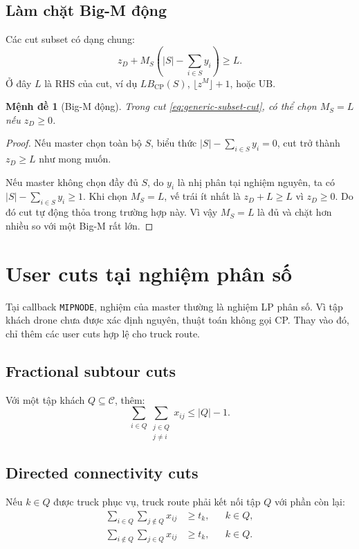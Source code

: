 \documentclass[12pt,a4paper]{article}
\newtheorem{proposition}{Mệnh đề}
\newcommand{\C}{\mathcal{C}}
\newcommand{\UB}{\mathrm{UB}}
\begin{document}
\subsection{Làm chặt Big-M động}

Các cut subset có dạng chung:
\begin{equation}
    z_D+M_S\left(|S|-\sum_{i\in S}y_i\right)\ge L.
    \label{eq:generic-subset-cut}
\end{equation}
Ở đây $L$ là RHS của cut, ví dụ $LB_{\mathrm{CP}}(S)$, $\lfloor z^M\rfloor+1$, hoặc $\UB$.

\begin{proposition}[Big-M động]
Trong cut \eqref{eq:generic-subset-cut}, có thể chọn $M_S=L$ nếu $z_D\ge 0$.
\end{proposition}
\begin{proof}
Nếu master chọn toàn bộ $S$, biểu thức $|S|-\sum_{i\in S}y_i=0$, cut trở thành $z_D\ge L$ như mong muốn.

Nếu master không chọn đầy đủ $S$, do $y_i$ là nhị phân tại nghiệm nguyên, ta có $|S|-\sum_{i\in S}y_i\ge 1$. Khi chọn $M_S=L$, vế trái ít nhất là $z_D+L\ge L$ vì $z_D\ge 0$. Do đó cut tự động thỏa trong trường hợp này. Vì vậy $M_S=L$ là đủ và chặt hơn nhiều so với một Big-M rất lớn.
\end{proof}

\section{User cuts tại nghiệm phân số}
\label{sec:mipnode-cuts}

Tại callback \texttt{MIPNODE}, nghiệm của master thường là nghiệm LP phân số. Vì tập khách drone chưa được xác định nguyên, thuật toán không gọi CP. Thay vào đó, chỉ thêm các user cuts hợp lệ cho truck route.

\subsection{Fractional subtour cuts}
Với một tập khách $Q\subseteq \C$, thêm:
\begin{equation}
    \sum_{i\in Q}\sum_{\substack{j\in Q\\j\neq i}}x_{ij}\le |Q|-1.
    \label{eq:mipnode-subtour}
\end{equation}

\subsection{Directed connectivity cuts}
Nếu $k\in Q$ được truck phục vụ, truck route phải kết nối tập $Q$ với phần còn lại:
\begin{align}
    \sum_{i\in Q}\sum_{j\notin Q}x_{ij} &\ge t_k, && k\in Q, \label{eq:out-cut}\\
    \sum_{i\notin Q}\sum_{j\in Q}x_{ij} &\ge t_k, && k\in Q. \label{eq:in-cut}
\end{align}
\end{document}
